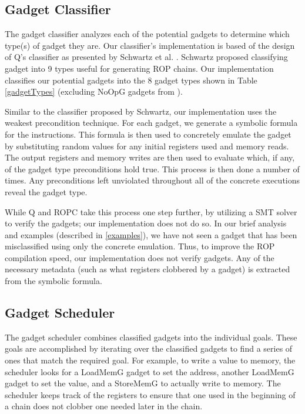 \documentclass[journal]{IEEEtran}
\begin{document}
\subsection{Gadget Classifier}
The gadget classifier analyzes each of the potential gadgets to determine which type(s) of gadget they are.
Our classifier's implementation is based of the design of Q's classifier as presented by Schwartz et al. \cite{schwartz2011q}.
Schwartz proposed classifying gadget into 9 types useful for generating ROP chains.
Our implementation classifies our potential gadgets into the 8 gadget types shown in Table \ref{gadgetTypes} (excluding NoOpG gadgets from \cite{schwartz2011q}).

Similar to the classifier proposed by Schwartz, our implementation uses the weakest precondition technique.
For each gadget, we generate a symbolic formula for the instructions.
This formula is then used to concretely emulate the gadget by substituting random values for any initial registers used and memory reads.
The output registers and memory writes are then used to evaluate which, if any, of the gadget type preconditions hold true.
This process is then done a number of times.
Any preconditions left unviolated throughout all of the concrete executions reveal the gadget type.

While Q \cite{schwartz2011q} and ROPC \cite{ropc} take this process one step further, by utilizing a SMT solver to verify the gadgets; our implementation does not do so.
In our brief analysis and examples (described in \ref{examples}), we have not seen a gadget that has been misclassified using only the concrete emulation.
Thus, to improve the ROP compilation speed, our implementation does not verify gadgets.
Any of the necessary metadata (such as what registers clobbered by a gadget) is extracted from the symbolic formula.

\subsection{Gadget Scheduler}\label{scheduler}
The gadget scheduler combines classified gadgets into the individual goals.
These goals are accomplished by iterating over the classified gadgets to find a series of ones that match the required goal. 
For example, to write a value to memory, the scheduler looks for a LoadMemG gadget to set the address, another LoadMemG gadget to set the value, and a StoreMemG to actually write to memory.
The scheduler keeps track of the registers to ensure that one used in the beginning of a chain does not clobber one needed later in the chain.
\end{document}
